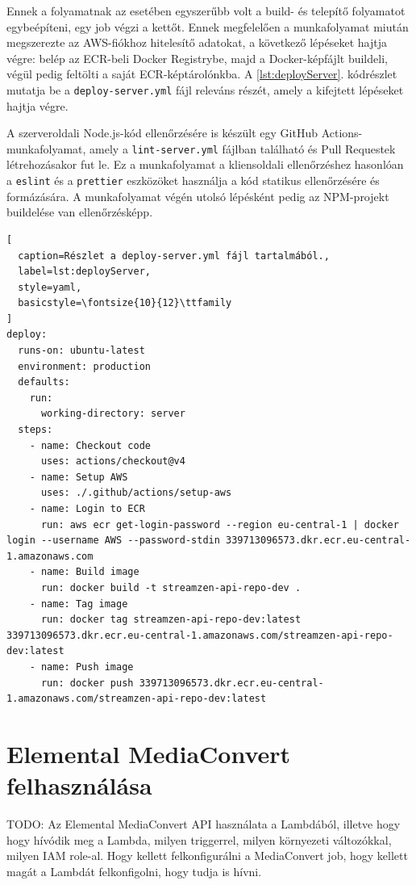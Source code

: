 Ennek a folyamatnak az esetében egyszerűbb volt a build- és telepítő folyamatot egybeépíteni, egy job végzi a kettőt. Ennek megfelelően a munkafolyamat miután megszerezte az AWS-fiókhoz hitelesítő adatokat, a következő lépéseket hajtja végre: belép az ECR-beli Docker Registrybe, majd a Docker-képfájlt buildeli, végül pedig feltölti a saját ECR-képtárolónkba. A \ref{lst:deployServer}. kódrészlet mutatja be a \verb|deploy-server.yml| fájl releváns részét, amely a kifejtett lépéseket hajtja végre.

A szerveroldali Node.js-kód ellenőrzésére is készült egy GitHub Actions-munkafolyamat, amely a \verb|lint-server.yml| fájlban található és Pull Requestek létrehozásakor fut le. Ez a munkafolyamat a kliensoldali ellenőrzéshez hasonlóan a \verb|eslint| és a \verb|prettier| eszközöket használja a kód statikus ellenőrzésére és formázására. A munkafolyamat végén utolsó lépésként pedig az NPM-projekt buildelése van ellenőrzésképp.

\begin{minipage}{0.92\textwidth}
  \begin{lstlisting}[
  caption=Részlet a deploy-server.yml fájl tartalmából.,
  label=lst:deployServer,
  style=yaml,
  basicstyle=\fontsize{10}{12}\ttfamily
]
deploy:
  runs-on: ubuntu-latest
  environment: production
  defaults:
    run:
      working-directory: server
  steps:
    - name: Checkout code
      uses: actions/checkout@v4
    - name: Setup AWS
      uses: ./.github/actions/setup-aws
    - name: Login to ECR
      run: aws ecr get-login-password --region eu-central-1 | docker login --username AWS --password-stdin 339713096573.dkr.ecr.eu-central-1.amazonaws.com
    - name: Build image
      run: docker build -t streamzen-api-repo-dev .
    - name: Tag image
      run: docker tag streamzen-api-repo-dev:latest 339713096573.dkr.ecr.eu-central-1.amazonaws.com/streamzen-api-repo-dev:latest
    - name: Push image
      run: docker push 339713096573.dkr.ecr.eu-central-1.amazonaws.com/streamzen-api-repo-dev:latest
\end{lstlisting}
\end{minipage}

\section{Elemental MediaConvert felhasználása}

TODO: Az Elemental MediaConvert API használata a Lambdából, illetve hogy hogy hívódik meg a Lambda, milyen triggerrel, milyen környezeti változókkal, milyen IAM role-al. Hogy kellett felkonfigurálni a MediaConvert job, hogy kellett magát a Lambdát felkonfigolni, hogy tudja is hívni.

